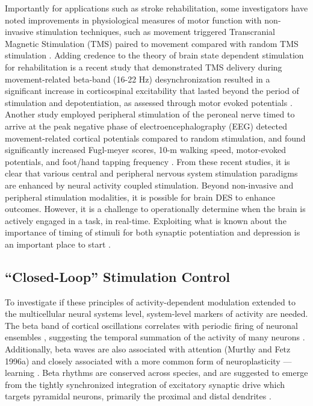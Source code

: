 Importantly for applications such as stroke rehabilitation, some investigators have noted improvements in physiological measures of motor function with non-invasive stimulation techniques, such as movement triggered Transcranial Magnetic Stimulation (TMS) paired to movement compared with random TMS stimulation \cite{Buetefisch2011}. Adding credence to the theory of brain state dependent stimulation for rehabilitation is a recent study that demonstrated TMS delivery during movement-related beta-band (16-22 Hz) desynchronization resulted in a significant increase in corticospinal excitability that lasted beyond the period of stimulation and depotentiation, as assessed through motor evoked potentials \cite{Kraus2016}.  Another study employed peripheral stimulation of the peroneal nerve timed to arrive at the peak negative phase of electroencephalography (EEG) detected movement-related cortical potentials compared to random stimulation, and found significantly increased Fugl-meyer scores, 10-m walking speed, motor-evoked potentials, and foot/hand tapping frequency \cite{Mrachacz-Kersting2015a}. From these recent studies, it is clear that various central and peripheral nervous system stimulation paradigms are enhanced by neural activity coupled stimulation. Beyond non-invasive and peripheral stimulation modalities, it is possible for brain DES to enhance outcomes. However, it is a challenge to operationally determine when the brain is actively engaged in a task, in real-time. Exploiting what is known about the importance of timing of stimuli for both synaptic potentiation and depression is an important place to start \cite{Feldman2012}. 

\subsection{“Closed-Loop” Stimulation Control}
To investigate if these principles of activity-dependent modulation extended to the multicellular neural systems level, system-level markers of activity are needed. The beta band of cortical oscillations correlates with periodic firing of neuronal ensembles \cite{Murthy1996,Murthy1996a}, suggesting the temporal summation of the activity of many neurons \cite{Okun2010}. Additionally, beta waves are also associated with attention (Murthy and Fetz 1996a) and closely associated with a more common form of neuroplasticity — learning \cite{Hikosaka2002}. Beta rhythms are conserved across species, and are suggested to emerge from the tightly synchronized integration of excitatory synaptic drive which targets pyramidal neurons, primarily the proximal and distal dendrites \cite{Sherman2016}.

